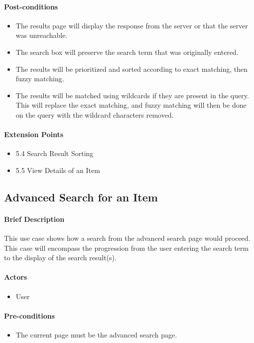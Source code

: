 \documentclass{article}
\begin{document}
\paragraph{Post-conditions}
\begin{itemize}
\item The results page will display the response from the server or that the server was unreachable.
\item The search box will preserve the search term that was originally entered.
\item The results will be prioritized and sorted according to exact matching, then fuzzy matching.
\item The results will be matched using wildcards if they are present in the query.  This will replace the exact matching, and fuzzy matching will then be done on the query with the wildcard characters removed.
\end{itemize}

\paragraph{Extension Points}
\begin{itemize}
\item 5.4 Search Result Sorting
\item 5.5 View Details of an Item
\end{itemize}


\subsection{Advanced Search for an Item}

\paragraph{Brief Description}
This use case shows how a search from the advanced search page  would proceed. This case will encompass the progression from the user entering the search term to the display of the search result(s).

\paragraph{Actors}
\begin{itemize}
\item User
\end{itemize}

\paragraph{Pre-conditions}
\begin{itemize}
\item The current page must be the advanced search page.
\end{itemize}
\end{document}
